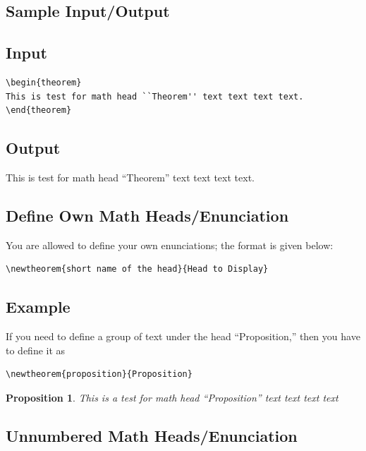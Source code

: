 \documentclass[]{imag-ms-template}
\begin{document}
\subsection*{Sample Input/Output}

\subsection{Input}

\begin{verbatim}
\begin{theorem}
This is test for math head ``Theorem'' text text text text.
\end{theorem}
\end{verbatim}

\subsection{Output}

\begin{theorem}
This is test for math head ``Theorem'' text text text text.
\end{theorem}

\subsection{Define Own Math Heads/Enunciation}

You are allowed to define your own enunciations; the format is given
below:

\begin{verbatim}
\newtheorem{short name of the head}{Head to Display}
\end{verbatim}

\subsection*{Example}

If you need to define a group of text under the head ``Proposition,''
then you have to define it as 

\begin{verbatim}
\newtheorem{proposition}{Proposition}
\end{verbatim}

\newtheorem{proposition}{Proposition}
\begin{proposition}
This is a test for math head ``Proposition'' text text text text
\end{proposition}

\subsection{Unnumbered Math Heads/Enunciation}
\end{document}

